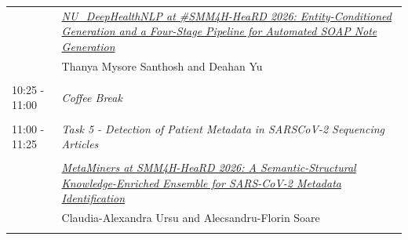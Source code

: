 \documentclass[11pt,oneside]{book}
\begin{document}
\begin{tabular}{p{24mm}p{124mm}}
                
                      & \hyperlink{page.103}{\emph{NU\_DeepHealthNLP at \#SMM4H-HeaRD 2026: Entity-Conditioned Generation and a Four-Stage Pipeline for Automated SOAP Note Generation}}\\
        & Thanya Mysore Santhosh\index{Santhosh} and Deahan Yu\index{Yu}\\\\
                      10:25 - 11:00 & \emph{Coffee Break}\\\\
      
                      11:00 - 11:25 & \emph{Task 5 - Detection of Patient Metadata in SARSCoV-2 Sequencing Articles}\\\\
      
                
                      & \hyperlink{page.272}{\emph{MetaMiners at SMM4H-HeaRD 2026: A Semantic-Structural Knowledge-Enriched Ensemble for SARS-CoV-2 Metadata Identification}}\\
        & Claudia-Alexandra Ursu\index{Ursu} and Alecsandru-Florin Soare\index{Soare}\\\\
              \end{tabular}
    \newpage
\end{document}
